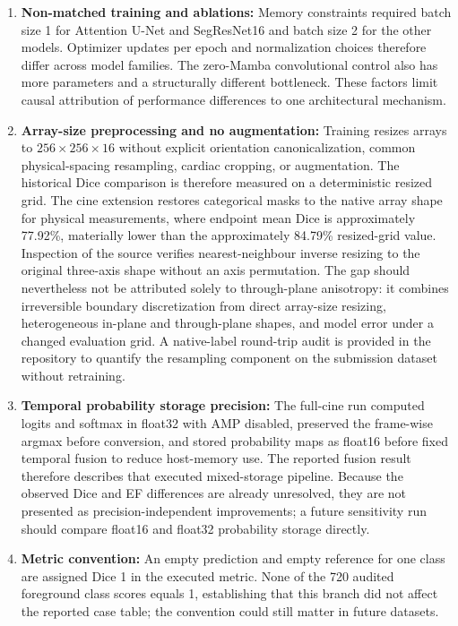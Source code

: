 \begin{enumerate}
    \item \textbf{Non-matched training and ablations:} Memory constraints required batch size 1 for Attention U-Net and SegResNet16 and batch size 2 for the other models. Optimizer updates per epoch and normalization choices therefore differ across model families. The zero-Mamba convolutional control also has more parameters and a structurally different bottleneck. These factors limit causal attribution of performance differences to one architectural mechanism.
    \item \textbf{Array-size preprocessing and no augmentation:} Training resizes arrays to $256\times256\times16$ without explicit orientation canonicalization, common physical-spacing resampling, cardiac cropping, or augmentation. The historical Dice comparison is therefore measured on a deterministic resized grid. The cine extension restores categorical masks to the native array shape for physical measurements, where endpoint mean Dice is approximately 77.92\%, materially lower than the approximately 84.79\% resized-grid value. Inspection of the source verifies nearest-neighbour inverse resizing to the original three-axis shape without an axis permutation. The gap should nevertheless not be attributed solely to through-plane anisotropy: it combines irreversible boundary discretization from direct array-size resizing, heterogeneous in-plane and through-plane shapes, and model error under a changed evaluation grid. A native-label round-trip audit is provided in the repository to quantify the resampling component on the submission dataset without retraining.
    \item \textbf{Temporal probability storage precision:} The full-cine run computed logits and softmax in float32 with AMP disabled, preserved the frame-wise argmax before conversion, and stored probability maps as float16 before fixed temporal fusion to reduce host-memory use. The reported fusion result therefore describes that executed mixed-storage pipeline. Because the observed Dice and EF differences are already unresolved, they are not presented as precision-independent improvements; a future sensitivity run should compare float16 and float32 probability storage directly.
    \item \textbf{Metric convention:} An empty prediction and empty reference for one class are assigned Dice 1 in the executed metric. None of the 720 audited foreground class scores equals 1, establishing that this branch did not affect the reported case table; the convention could still matter in future datasets.

\end{enumerate}
